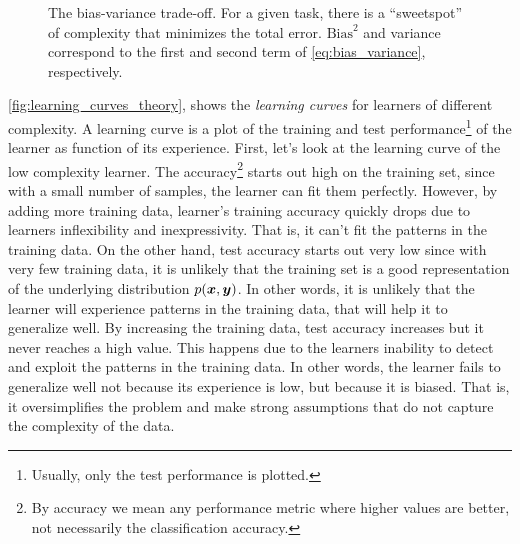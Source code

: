 \begin{figure}
	\centering
	\caption[The bias-variance trade-off.]{The bias-variance
	trade-off. For a given task,
	there is a ``sweetspot'' of complexity that minimizes the total error.
	$\text{Bias}^2$ and variance correspond to the first and second term of
	\Equation{} \ref{eq:bias_variance}, respectively.}
	\label{fig:bias_variance}
\end{figure}

\Figure{} \ref{fig:learning_curves_theory}, shows the \emph{learning
curves} for learners of different complexity. A learning
curve is a plot of the training and test performance\footnote{Usually, only the test performance
is plotted.} of the learner as function of its experience.
First, let's look at the learning curve of the low complexity learner. The
accuracy\footnote{By accuracy we mean any performance metric where higher values are better, not necessarily the classification
accuracy.} starts out high on the training
set, since with a small number of samples, the learner can
fit them perfectly. However, by adding more training data, learner's training
accuracy quickly drops due to learners inflexibility
and inexpressivity. That is, it can't fit the patterns in the training data. On
the other hand, test accuracy starts out very low since
with very few training data, it is unlikely that the training set is a good
representation of the underlying distribution $p(\boldsymbol{x},
\boldsymbol{y})$. In other words, it is unlikely that the learner will experience patterns
in the training data, that will help it to generalize well. By increasing the
training data, test accuracy increases but it never reaches a high value. This
happens due to the learners inability to detect and exploit the patterns in the
training data.  In other words, the learner fails to generalize well not because
its experience is low, but because it is biased. That is, it oversimplifies the
problem and make strong assumptions that do not capture the complexity of the
data.


